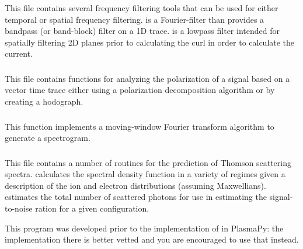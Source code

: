 \subsubsection{}
This file contains several frequency filtering tools that can be used for either temporal or spatial frequency filtering.  is a Fourier-filter than provides a bandpass (or band-block) filter on a 1D trace.  is a lowpass filter intended for spatially filtering 2D planes prior to calculating the curl in order to calculate the current.



\subsubsection{}

This file contains functions for analyzing the polarization of a signal based on a vector time trace either using a polarization decomposition algorithm or by creating a hodograph.

\subsubsection{}

This function implements a moving-window Fourier transform algorithm to generate a spectrogram. 

\subsubsection{}

This file contains a number of routines for the prediction of Thomson scattering spectra.  calculates the spectral density function in a variety of regimes given a description of the ion and electron distributions (assuming Maxwellians).  estimates the total number of scattered photons for use in estimating the signal-to-noise ration for a given configuration.

This program was developed prior to the implementation of  in PlasmaPy: the implementation there is better vetted and you are encouraged to use that instead.


\subsection{}

